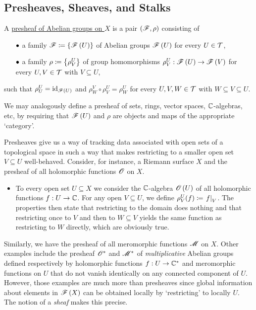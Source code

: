 \documentclass[../Moduli_Spaces_of_Riemann_Surfaces.tex]{subfiles}
\begin{document}
    \subsection{Presheaves, Sheaves, and Stalks}
    \begin{definition}
        A \ul{presheaf of Abelian groups on $X$} is a pair $\left(\mathscr{F},\rho\right)$ consisting of
        \begin{itemize}
            \item[$\bullet$] a family $\mathscr{F}\coloneqq\left\{\mathscr{F}\left(U\right)\right\}$ of Abelian groups $\mathscr{F}\left(U\right)$ for every $U\in\mathcal{T}$,
                \vspace{-0.05in}
            \item[$\bullet$] a family $\rho\coloneqq\left\{\rho^U_V\right\}$ of group homomorphisms $\rho^U_V:\mathscr{F}\left(U\right)\to\mathscr{F}\left(V\right)$ for every $U,V\in\mathcal{T}$ with $V\subseteq U$,
        \end{itemize}
        such that $\rho^U_U=\operatorname{id}_{\mathscr{F}\left(U\right)}$ and $\rho^V_W\circ\rho^U_V=\rho^U_W$ for every $U,V,W\in\mathcal{T}$ with $W\subseteq V\subseteq U$.
    \end{definition}
    \begin{remark}
        We may analogously define a presheaf of sets, rings, vector spaces, $\mathbb{C}$-algebras, etc, by requiring that $\mathscr{F}\left(U\right)$ and $\rho$ are objects and maps of the appropriate `category'.\exqed
    \end{remark}
    \begin{remark}
        Presheaves give us a way of tracking data associated with open sets of a topological space in such a way that makes restricting to a smaller open set $V\subseteq U$ well-behaved. Consider, for instance, a Riemann surface $X$ and the presheaf of all holomorphic functions $\mathscr{O}$ on $X$.
        \begin{itemize}
            \item To every open set $U\subseteq X$ we consider the $\mathbb{C}$-algebra $\mathscr{O}\left(U\right)$ of all holomorphic functions $f:U\to\mathbb{C}$. For any open $V\subseteq U$, we define $\rho^U_V\!\left(f\right)\coloneqq\left.f\right|_V$. The properties then state that restricting to the domain does nothing and that restricting once to $V$ and then to $W\subseteq V$ yields the same function as restricting to $W$ directly, which are obviously true.
        \end{itemize}
        Similarly, we have the presheaf of all meromorphic functions $\mathscr{M}$ on $X$. Other examples include the presheaf $\mathscr{O}^\ast$ and $\mathscr{M}^\ast$ of \textit{multiplicative} Abelian groups defined respectively by holomorphic functions $f:U\to\mathbb{C}^\ast$ and meromorphic functions on $U$ that do not vanish identically on any connected component of $U$. However, those examples are much more than presheaves since global information about elements in $\mathscr{F}\left(X\right)$ can be obtained locally by `restricting' to locally $U$. The notion of a \textit{sheaf} makes this precise.\exqed
    \end{remark}
\end{document}
